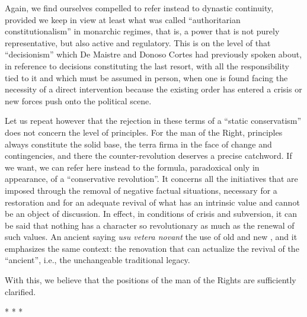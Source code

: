 Again, we find ourselves compelled to refer instead to dynastic continuity, provided we keep in view at least what was called ``authoritarian constitutionalism'' in monarchic regimes, that is, a power that is not purely representative, but also active and regulatory. This is on the level of that ``decisionism'' which De Maistre and Donoso Cortes had previously spoken about, in reference to decisions constituting the last resort, with all the responsibility tied to it and which must be assumed in person, when one is found facing the necessity of a direct intervention because the existing order has entered a crisis or new forces push onto the political scene.

Let us repeat however that the rejection in these terms of a ``static conservatism'' does not concern the level of principles. For the man of the Right, principles always constitute the solid base, the terra firma in the face of change and contingencies, and there the counter-revolution deserves a precise catchword. If we want, we can refer here instead to the formula, paradoxical only in appearance, of a ``conservative revolution''. It concerns all the initiatives that are imposed through the removal of negative factual situations, necessary for a restoration and for an adequate revival of what has an intrinsic value and cannot be an object of discussion. In effect, in conditions of crisis and subversion, it can be said that nothing has a character so revolutionary as much as the renewal of such values. An ancient saying \emph{usu vetera novant} the use of old and new , and it emphasizes the same context: the renovation that can actualize the revival of the ``ancient'', i.e., the unchangeable traditional legacy.

With this, we believe that the positions of the man of the Rights are sufficiently clarified.



\begin{center}* * *\end{center}

